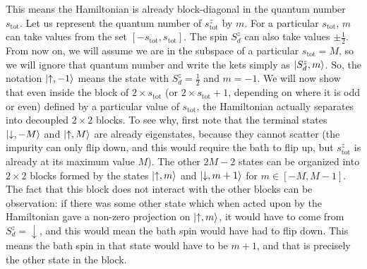 \documentclass{revtex4-2}
\numberwithin{equation}{section}
\begin{document}
This means the Hamiltonian is already block-diagonal in the quantum number \(s_\text{tot}\). Let us represent the quantum number of \(s_\text{tot}^z\) by \(m\). For a particular \(s_\text{tot}\), \(m\) can take values from the set \(\left[-s_\text{tot}, s_\text{tot}\right] \). The spin \(S_d^z\) can also take values \(\pm \frac{1}{2}\). From now on, we will assume we are in the subspace of a particular \(s_\text{tot} = M\), so we will ignore that quantum number and write the kets simply as \(\ket{S_d^z, m}\). So, the notation \(\ket{\uparrow,-1}\) means the state with \(S_d^z = \frac{1}{2}\) and \(m = -1\). We will now show that even inside the block of \(2\times s_\text{tot}\) (or \(2\times s_\text{tot} + 1\), depending on where it is odd or even) defined by a particular value of \(s_\text{tot}\), the Hamiltonian actually separates into decoupled \(2\times 2\) blocks. To see why, first note that the terminal states \(\ket{\downarrow, -M}\) and \(\ket{\uparrow, M}\) are already eigenstates, because they cannot scatter (the impurity can only flip down, and this would require the bath to flip up, but \(s^z_\text{tot}\) is already at its maximum value \(M\)). The other \(2M - 2\) states can be organized into \(2\times 2\) blocks formed by the states \(\ket{\uparrow, m}\) and \(\ket{\downarrow, m+1}\) for \(m \in \left[-M, M-1\right] \). The fact that this block does not interact with the other blocks can be observation: if there was some other state which when acted upon by the Hamiltonian gave a non-zero projection on \(\ket{\uparrow, m}\), it would have to come from \(S_d^z = \downarrow\), and this would mean the bath spin would have had to flip down. This means the bath spin in that state would have to be \(m+1\), and that is precisely the other state in the block. 
\end{document}
